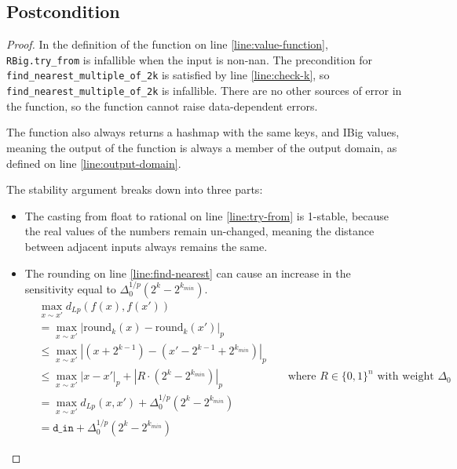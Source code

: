 \documentclass{article}
\begin{document}
\subsection*{Postcondition}
\begin{theorem}
\end{theorem}

\begin{proof}
    In the definition of the function on line \ref{line:value-function},
    \texttt{RBig.try\_from} is infallible when the input is non-nan.
    The precondition for \texttt{find\_nearest\_multiple\_of\_2k} is satisfied by line \ref{line:check-k},
    so \texttt{find\_nearest\_multiple\_of\_2k} is infallible.
    There are no other sources of error in the function, 
    so the function cannot raise data-dependent errors.

    The function also always returns a hashmap with the same keys, and IBig values,
    meaning the output of the function is always a member of the output domain,
    as defined on line \ref{line:output-domain}.

    The stability argument breaks down into three parts:
    \begin{itemize}
        \item The casting from float to rational on line \ref{line:try-from} is 1-stable,
        because the real values of the numbers remain un-changed,
        meaning the distance between adjacent inputs always remains the same.
        \item The rounding on line \ref{line:find-nearest} can cause an increase in the sensitivity equal to $\Delta_0^{1/p} (2^k - 2^{k_{min}})$.
        \begin{align}
            & \max_{x \sim x'} d_{Lp}(f(x), f(x'))\\
            & = \max_{x \sim x'} |\mathrm{round}_k(x) - \mathrm{round}_k(x')|_p\\
            & \leq \max_{x \sim x'} |(x + 2^{k - 1}) - (x' - 2^{k - 1} + 2^{k_{min}})|_p\\
            & \leq \max_{x \sim x'} |x - x'|_p + |R \cdot (2^{k} - 2^{k_{min}})|_p &&\text{ where } R \in \{0, 1\}^n \text{ with weight } \Delta_0\\
            & = \max_{x \sim x'} d_{Lp}(x, x') + \Delta_0^{1/p} (2^{k} - 2^{k_{min}})\\
            & = \texttt{d\_in} + \Delta_0^{1/p} (2^{k} - 2^{k_{min}})
        \end{align}
    

\end{itemize}
\end{proof}
\end{document}

